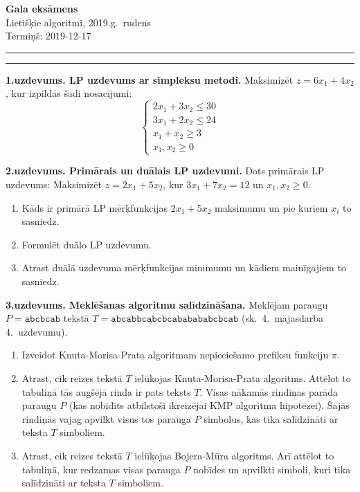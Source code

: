\documentclass[a4paper,12pt]{article}
\begin{document}
\thispagestyle{empty}

\begin{center}
{\bf\Huge Gala eksāmens} \\[5pt]
Lietišķie algoritmi, 2019.g.\ rudens\\
Termiņš: 2019-12-17
\end{center}

\hrule
\vspace{2pt}
\hrule
\vspace{12pt}


\noindent
{\bf 1.uzdevums. LP uzdevums ar simpleksu metodi.}  
Maksimizēt $z = 6x_1 + 4x_2$, kur izpildās šādi nosacījumi:
$$\left\{ \begin{array}{l}
2x_1 + 3x_2 \leq 30\\
3x_1 + 2x_2 \leq 24\\
x_1 + x_2 \geq 3\\
x_1,x_2 \geq 0
\end{array} \right.$$

\vspace{6pt}
{\bf 2.uzdevums. Primārais un duālais LP uzdevumi.}
Dots primārais LP uzdevums: Maksimizēt $z = 2 x_1 + 5 x_2$, 
kur $3 x_1 + 7x_2  = 12$ un $x_1, x_2 \geq 0$. 
\begin{enumerate}[label=(\alph*)]
\item Kāds ir primārā LP mērķfunkcijas $2x_1 + 5x_2$ maksimumu un pie kuriem $x_i$ to sasniedz.
\item Formulēt duālo LP uzdevumu. 
\item Atrast duālā uzdevuma mērķfunkcijas minimumu un kādiem mainīgajiem to sasniedz.
\end{enumerate}


\vspace{6pt}
{\bf 3.uzdevums. Meklēšanas algoritmu salīdzināšana.} Meklējam paraugu $P = \mathtt{abcbcab}$
tekstā $T = \mathtt{abcabbcabcbcababababcbcab}$ (sk.\ 4.\ mājasdarba 4.\ uzdevumu). 
\begin{enumerate}[label=(\alph*)]
\item Izveidot Knuta-Morisa-Prata algoritmam nepieciešamo prefiksu funkciju $\pi$. 
\item Atrast, cik reizes tekstā $T$ ielūkojas
Knuta-Morisa-Prata algoritms. Attēlot to tabuliņā \textendash{} 
tās augšējā rinda ir pats teksts $T$. 
Visas nākamās rindiņas parāda paraugu $P$ (kas nobīdīts
atbilstoši ikreizējai KMP algoritma hipotēzei). 
Šajās rindiņās vajag apvilkt visus tos parauga $P$ 
simbolus, kas tika salīdzināti ar teksta $T$ simboliem. 
\item Atrast, cik reizes tekstā $T$ ielūkojas
Bojera-Mūra algoritms. Arī attēlot to tabuliņā, kur 
redzamas visas parauga $P$ nobīdes un apvilkti simboli, 
kuri tika salīdzināti ar teksta $T$ simboliem. 
\end{enumerate}
\end{document}
